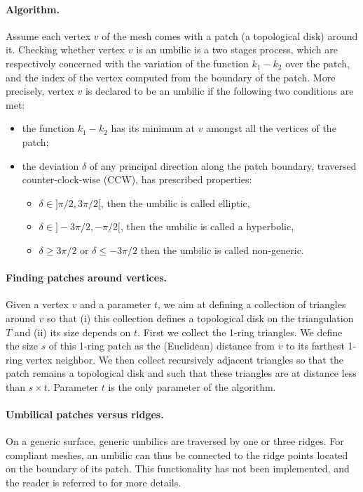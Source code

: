 \paragraph{Algorithm.}
Assume each vertex $v$ of the mesh comes with a patch (a topological
disk) around it. Checking whether vertex $v$ is an umbilic is a two
stages process, which are respectively concerned with the variation
of the function $k_1-k_2$ over the patch, and the index of the vertex
computed from the boundary of the patch. More precisely, vertex $v$ is
declared to be an umbilic if the following two conditions are met:
\begin{itemize}
\item
the function $k_1-k_2$ has its minimum at $v$ amongst all the
vertices of the patch;
\item
the deviation $\delta$ of any principal direction along the patch
boundary, traversed counter-clock-wise (CCW), has prescribed
properties:
\begin{itemize}
\item
$\delta \in ]\pi/2,3\pi/2[$, then the umbilic is called elliptic,
\item
$\delta \in ]-3\pi/2,-\pi/2[$, then the umbilic is called a hyperbolic,
\item
$\delta \geq 3\pi/2$ or $\delta \leq -3\pi/2$ then the umbilic is called non-generic.
\end{itemize}
\end{itemize}


\paragraph{Finding patches around vertices.}
Given a vertex $v$ and a parameter $t$, we aim at defining a
collection of triangles around $v$ so that (i) this collection defines
a topological disk on the triangulation $T$ and (ii) its size depends
on $t$. First we collect the 1-ring triangles. We define the size $s$
of this 1-ring patch as the (Euclidean) distance from $v$ to its
farthest 1-ring vertex neighbor. We then collect recursively adjacent
triangles so that the patch remains a topological disk and such that
these triangles are at distance less than $s\times t$. Parameter $t$
is the only parameter of the algorithm.

\paragraph{Umbilical patches versus ridges.} On a generic surface,
generic umbilics are traversed by one or three ridges. For compliant
meshes, an umbilic can thus be connected to the ridge points located
on the boundary of its patch. This functionality has not been
implemented, and the reader is referred to \cite{cgal:cp-tdare-05} for
more details.

